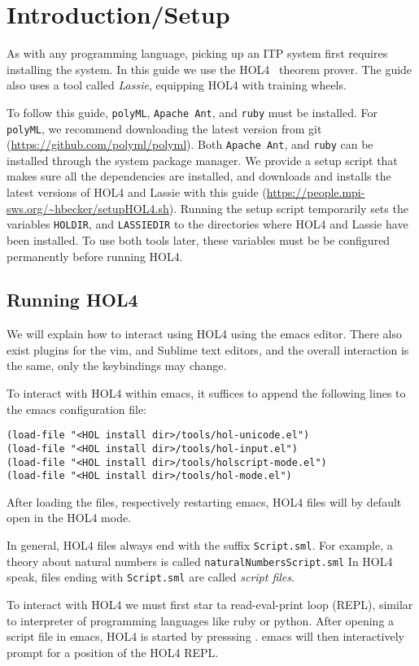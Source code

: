 \section{Introduction/Setup}
%
As with any programming language, picking up an ITP system first requires
installing the system.
In this guide we use the HOL4~\cite{HOL4web} theorem prover.
The guide also uses a tool called \emph{Lassie}, equipping HOL4 with training
wheels.

To follow this guide, \texttt{polyML}, \texttt{Apache Ant}, and \texttt{ruby}
must be installed.
For \texttt{polyML}, we recommend downloading the latest version from git
(\url{https://github.com/polyml/polyml}).
Both \texttt{Apache Ant}, and \texttt{ruby} can be installed through the system
package manager.
We provide a setup script that makes sure all the dependencies are installed,
and downloads and installs the latest versions of HOL4 and Lassie with this
guide (\url{https://people.mpi-sws.org/~hbecker/setupHOL4.sh}).
Running the setup script temporarily sets the variables \texttt{HOLDIR}, and
\texttt{LASSIEDIR} to the directories where HOL4 and Lassie have been installed.
To use both tools later, these variables must be be configured permanently
before running HOL4.

\subsection{Running HOL4}

We will explain how to interact using HOL4 using the emacs editor.
There also exist plugins for the vim, and Sublime text editors, and the overall
interaction is the same, only the keybindings may change.

To interact with HOL4 within emacs, it suffices to append the following lines to
the emacs configuration file:
\begin{lstlisting}
(load-file "<HOL install dir>/tools/hol-unicode.el")
(load-file "<HOL install dir>/tools/hol-input.el")
(load-file "<HOL install dir>/tools/holscript-mode.el")
(load-file "<HOL install dir>/tools/hol-mode.el")
\end{lstlisting}

After loading the files, respectively restarting emacs, HOL4 files will by
default open in the HOL4 mode.

In general, HOL4 files always end with the suffix \texttt{Script.sml}.
For example, a theory about natural numbers is called
\texttt{naturalNumbersScript.sml}
In HOL4 speak, files ending with \texttt{Script.sml} are called \emph{script files}.

To interact with HOL4 we must first star ta read-eval-print loop (REPL), similar
to interpreter of programming languages like ruby or python.
After opening a script file in emacs, HOL4 is started by presssing
.
emacs will then interactively prompt for a position of the HOL4 REPL.